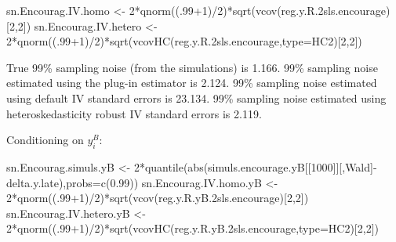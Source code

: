 \documentclass[
]{book}
\newenvironment{Shaded}{\begin{snugshade}}{\end{snugshade}}
\newcommand{\AttributeTok}[1]{\textcolor[rgb]{0.77,0.63,0.00}{#1}}
\newcommand{\DecValTok}[1]{\textcolor[rgb]{0.00,0.00,0.81}{#1}}
\newcommand{\FloatTok}[1]{\textcolor[rgb]{0.00,0.00,0.81}{#1}}
\newcommand{\FunctionTok}[1]{\textcolor[rgb]{0.00,0.00,0.00}{#1}}
\newcommand{\NormalTok}[1]{#1}
\newcommand{\OtherTok}[1]{\textcolor[rgb]{0.56,0.35,0.01}{#1}}
\newcommand{\SpecialCharTok}[1]{\textcolor[rgb]{0.00,0.00,0.00}{#1}}
\newcommand{\StringTok}[1]{\textcolor[rgb]{0.31,0.60,0.02}{#1}}
\theoremstyle{definition}
\theoremstyle{definition}
\theoremstyle{definition}
\theoremstyle{definition}
\theoremstyle{remark}
\begin{document}
\begin{Shaded}
\begin{Highlighting}[]
\NormalTok{sn.Encourag.IV.homo }\OtherTok{\textless{}{-}} \DecValTok{2}\SpecialCharTok{*}\FunctionTok{qnorm}\NormalTok{((.}\DecValTok{99}\SpecialCharTok{+}\DecValTok{1}\NormalTok{)}\SpecialCharTok{/}\DecValTok{2}\NormalTok{)}\SpecialCharTok{*}\FunctionTok{sqrt}\NormalTok{(}\FunctionTok{vcov}\NormalTok{(reg.y.R}\FloatTok{.2}\NormalTok{sls.encourage)[}\DecValTok{2}\NormalTok{,}\DecValTok{2}\NormalTok{])}
\NormalTok{sn.Encourag.IV.hetero }\OtherTok{\textless{}{-}} \DecValTok{2}\SpecialCharTok{*}\FunctionTok{qnorm}\NormalTok{((.}\DecValTok{99}\SpecialCharTok{+}\DecValTok{1}\NormalTok{)}\SpecialCharTok{/}\DecValTok{2}\NormalTok{)}\SpecialCharTok{*}\FunctionTok{sqrt}\NormalTok{(}\FunctionTok{vcovHC}\NormalTok{(reg.y.R}\FloatTok{.2}\NormalTok{sls.encourage,}\AttributeTok{type=}\StringTok{\textquotesingle{}HC2\textquotesingle{}}\NormalTok{)[}\DecValTok{2}\NormalTok{,}\DecValTok{2}\NormalTok{])}
\end{Highlighting}
\end{Shaded}

True 99\% sampling noise (from the simulations) is 1.166.
99\% sampling noise estimated using the plug-in estimator is 2.124.
99\% sampling noise estimated using default IV standard errors is 23.134.
99\% sampling noise estimated using heteroskedasticity robust IV standard errors is 2.119.

Conditioning on \(y_i^B\):

\begin{Shaded}
\begin{Highlighting}[]
\NormalTok{sn.Encourag.simuls.yB }\OtherTok{\textless{}{-}} \DecValTok{2}\SpecialCharTok{*}\FunctionTok{quantile}\NormalTok{(}\FunctionTok{abs}\NormalTok{(simuls.encourage.yB[[}\StringTok{\textquotesingle{}1000\textquotesingle{}}\NormalTok{]][,}\StringTok{\textquotesingle{}Wald\textquotesingle{}}\NormalTok{]}\SpecialCharTok{{-}}\NormalTok{delta.y.late),}\AttributeTok{probs=}\FunctionTok{c}\NormalTok{(}\FloatTok{0.99}\NormalTok{))}
\NormalTok{sn.Encourag.IV.homo.yB }\OtherTok{\textless{}{-}} \DecValTok{2}\SpecialCharTok{*}\FunctionTok{qnorm}\NormalTok{((.}\DecValTok{99}\SpecialCharTok{+}\DecValTok{1}\NormalTok{)}\SpecialCharTok{/}\DecValTok{2}\NormalTok{)}\SpecialCharTok{*}\FunctionTok{sqrt}\NormalTok{(}\FunctionTok{vcov}\NormalTok{(reg.y.R.yB}\FloatTok{.2}\NormalTok{sls.encourage)[}\DecValTok{2}\NormalTok{,}\DecValTok{2}\NormalTok{])}
\NormalTok{sn.Encourag.IV.hetero.yB }\OtherTok{\textless{}{-}} \DecValTok{2}\SpecialCharTok{*}\FunctionTok{qnorm}\NormalTok{((.}\DecValTok{99}\SpecialCharTok{+}\DecValTok{1}\NormalTok{)}\SpecialCharTok{/}\DecValTok{2}\NormalTok{)}\SpecialCharTok{*}\FunctionTok{sqrt}\NormalTok{(}\FunctionTok{vcovHC}\NormalTok{(reg.y.R.yB}\FloatTok{.2}\NormalTok{sls.encourage,}\AttributeTok{type=}\StringTok{\textquotesingle{}HC2\textquotesingle{}}\NormalTok{)[}\DecValTok{2}\NormalTok{,}\DecValTok{2}\NormalTok{])}
\end{Highlighting}
\end{Shaded}
\end{document}
